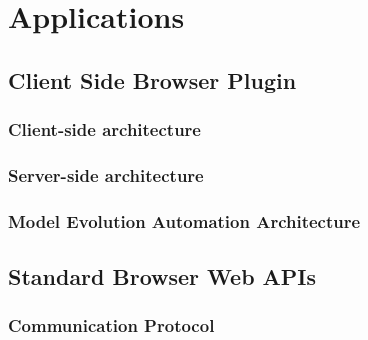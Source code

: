 \section{Applications}
\label{ch:app}


\subsection{Client Side Browser Plugin}

\subsubsection{Client-side architecture}



\subsubsection{Server-side architecture}


\subsubsection{Model Evolution Automation Architecture}

\subsection{Standard Browser Web APIs}

\subsubsection{Communication Protocol}

\cleardoublepage